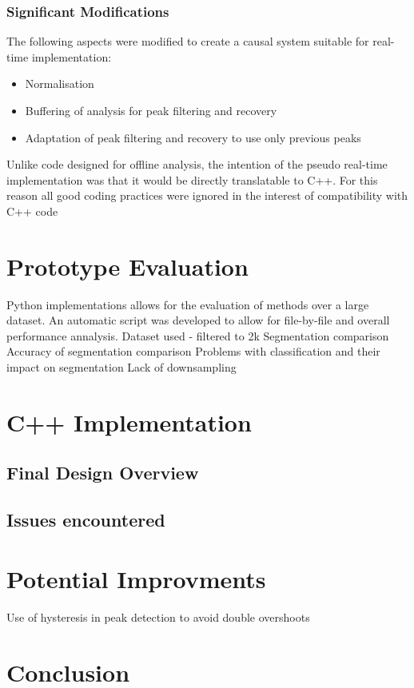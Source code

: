 \documentclass[titlepage]{scrartcl}
\begin{document}
\subsubsection{Significant Modifications}
The following aspects were modified to create a causal system suitable for
real-time implementation:
\begin{itemize}
    \item Normalisation
    \item Buffering of analysis for peak filtering and recovery
    \item Adaptation of peak filtering and recovery to use only previous peaks
\end{itemize}

Unlike code designed for offline analysis, the intention of the pseudo
real-time implementation was that it would be directly translatable to C++.
For this reason all good coding practices were ignored in the interest of compatibility with C++
code
\section{Prototype Evaluation}\label{pEval}
Python implementations allows for the evaluation of methods over a large
dataset. An automatic script was developed to allow for file-by-file and
overall performance annalysis.
Dataset used
- filtered to 2k
Segmentation comparison
Accuracy of segmentation comparison
Problems with classification and their impact on segmentation
Lack of downsampling
\section{C++ Implementation}
\subsection{Final Design Overview}
\subsection{Issues encountered}
\section{Potential Improvments}
Use of hysteresis in peak detection to avoid double overshoots
\section{Conclusion}
\end{document}
